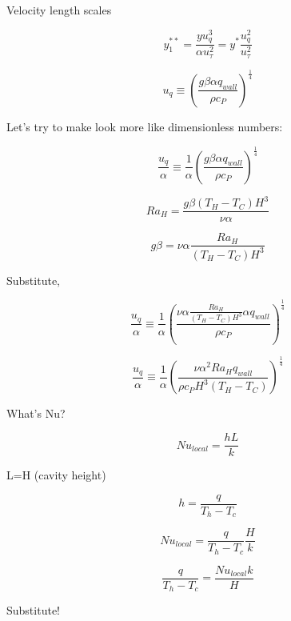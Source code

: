 \documentclass[12pt]{article}
\renewcommand{\_}{\kern-1.5pt\textunderscore\kern-1.5pt}
\begin{document}
Velocity length scales\par

 \[ y_{1}^{\ast\ast}=\frac{yu_{q}^{3}}{ \alpha u_{ \tau}^{2}}=y^{\ast}\frac{u_{q}^{2}}{u_{ \tau}^{2}} \] \par

 \[ u_{q} \equiv  \left( \frac{g \beta  \alpha q_{wall}}{ \rho c_{P}} \right) ^{\frac{1}{4}} \] \par

Let’s try to make look more like dimensionless numbers:\par

 \[ \frac{u_{q}}{ \alpha } \equiv \frac{1}{ \alpha } \left( \frac{g \beta  \alpha q_{wall}}{ \rho c_{P}} \right) ^{\frac{1}{4}} \] \par

 \[ Ra_{H}=\frac{g \beta  \left( T_{H}-T_{C} \right) H^{3}}{ \nu  \alpha } \] \par

 \[ g \beta = \nu  \alpha \frac{Ra_{H}}{ \left( T_{H}-T_{C} \right) H^{3}} \] \par

Substitute,\par

 \[ \frac{u_{q}}{ \alpha } \equiv \frac{1}{ \alpha } \left( \frac{ \nu  \alpha \frac{Ra_{H}}{ \left( T_{H}-T_{C} \right) H^{3}} \alpha q_{wall}}{ \rho c_{P}} \right) ^{\frac{1}{4}} \] \par

 \[ \frac{u_{q}}{ \alpha } \equiv \frac{1}{ \alpha } \left( \frac{ \nu  \alpha ^{2}Ra_{H}q_{wall}}{ \rho c_{P}H^{3} \left( T_{H}-T_{C} \right) } \right) ^{\frac{1}{4}} \] \par

What’s Nu?\par

 \[ Nu_{local}=\frac{hL}{k} \] \par

L=H (cavity height)\par


\vspace{\baselineskip}
 \[ h=\frac{q}{T_{h}-T_{c}} \] \par

 \[ Nu_{local}=\frac{q}{T_{h}-T_{c}}\frac{H}{k} \] \par

 \[ \frac{q}{T_{h}-T_{c}}=\frac{Nu_{local}k}{H} \] \par

Substitute!\par
\end{document}
